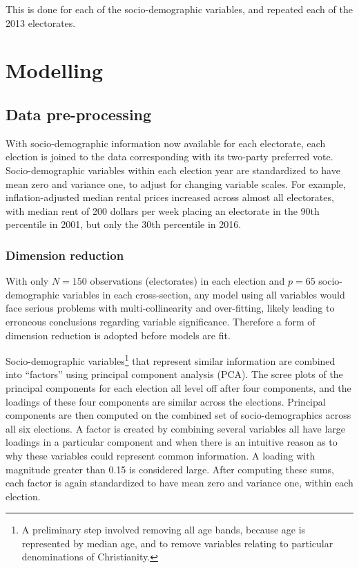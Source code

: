 \documentclass[openany]{book}
\let\rmarkdownfootnote\footnote%
\def\footnote{\protect\rmarkdownfootnote}
\begin{document}
This is done for each of the socio-demographic variables, and repeated each of the 2013 electorates.

\hypertarget{modelling}{%
\chapter{Modelling}\label{modelling}}

\hypertarget{data-pre-processing}{%
\section{Data pre-processing}\label{data-pre-processing}}

With socio-demographic information now available for each electorate, each election is joined to the data corresponding with its two-party preferred vote. Socio-demographic variables within each election year are standardized to have mean zero and variance one, to adjust for changing variable scales. For example, inflation-adjusted median rental prices increased across almost all electorates, with median rent of 200 dollars per week placing an electorate in the 90th percentile in 2001, but only the 30th percentile in 2016.

\hypertarget{dimension-reduction}{%
\subsection{Dimension reduction}\label{dimension-reduction}}

With only \(N = 150\) observations (electorates) in each election and \(p = 65\) socio-demographic variables in each cross-section, any model using all variables would face serious problems with multi-collinearity and over-fitting, likely leading to erroneous conclusions regarding variable significance. Therefore a form of dimension reduction is adopted before models are fit.

Socio-demographic variables\footnote{A preliminary step involved removing all age bands, because age is represented by median age, and to remove variables relating to particular denominations of Christianity.} that represent similar information are combined into ``factors'' using principal component analysis (PCA). The scree plots of the principal components for each election all level off after four components, and the loadings of these four components are similar across the elections. Principal components are then computed on the combined set of socio-demographics across all six elections. A factor is created by combining several variables all have large loadings in a particular component and when there is an intuitive reason as to why these variables could represent common information. A loading with magnitude greater than 0.15 is considered large. After computing these sums, each factor is again standardized to have mean zero and variance one, within each election.
\end{document}
